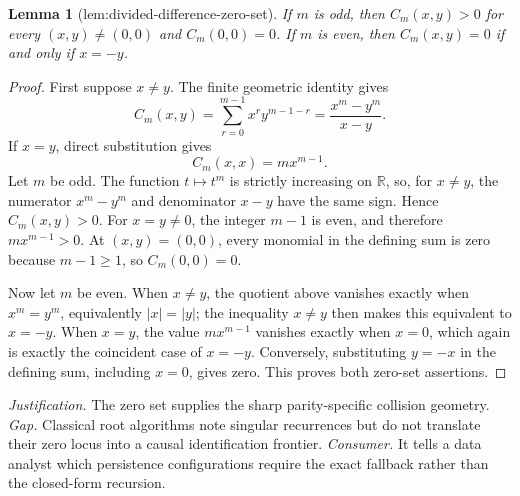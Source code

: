 \documentclass{article}
\newtheorem{lemma}{Lemma}
\begin{document}
\begin{lemma}[lem:divided-difference-zero-set]\label{lem:divided-difference-zero-set}
If \(m\) is odd, then \(C_m(x,y)>0\) for every \((x,y)\ne(0,0)\) and \(C_m(0,0)=0\). If \(m\) is even, then \(C_m(x,y)=0\) if and only if \(x=-y\).
\end{lemma}
\begin{proof}
First suppose \(x\ne y\).  The finite geometric identity gives
\[
 C_m(x,y)=\sum_{r=0}^{m-1}x^r y^{m-1-r}
 =\frac{x^m-y^m}{x-y}.
\]
If \(x=y\), direct substitution gives
\[
 C_m(x,x)=m x^{m-1}.
\]
Let \(m\) be odd.  The function \(t\mapsto t^m\) is strictly increasing on \(\mathbb R\), so, for \(x\ne y\), the numerator \(x^m-y^m\) and denominator \(x-y\) have the same sign.  Hence \(C_m(x,y)>0\).  For \(x=y\ne0\), the integer \(m-1\) is even, and therefore \(m x^{m-1}>0\).  At \((x,y)=(0,0)\), every monomial in the defining sum is zero because \(m-1\ge1\), so \(C_m(0,0)=0\).

Now let \(m\) be even.  When \(x\ne y\), the quotient above vanishes exactly when \(x^m=y^m\), equivalently \(|x|=|y|\); the inequality \(x\ne y\) then makes this equivalent to \(x=-y\).  When \(x=y\), the value \(m x^{m-1}\) vanishes exactly when \(x=0\), which again is exactly the coincident case of \(x=-y\).  Conversely, substituting \(y=-x\) in the defining sum, including \(x=0\), gives zero.  This proves both zero-set assertions.
\end{proof}
\par\smallskip\noindent \textit{Justification.} The zero set supplies the sharp parity-specific collision geometry. \textit{Gap.} Classical root algorithms note singular recurrences but do not translate their zero locus into a causal identification frontier. \textit{Consumer.} It tells a data analyst which persistence configurations require the exact fallback rather than the closed-form recursion.
\end{document}
